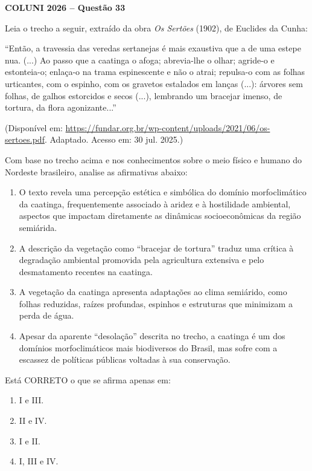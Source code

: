 \textbf{COLUNI 2026 -- Questão 33}\par\medskip Leia o trecho a seguir, extraído da obra \textit{Os Sertões} (1902), de Euclides da Cunha:

“Então, a travessia das veredas sertanejas é mais exaustiva que a de uma estepe nua. (...) Ao passo que a caatinga o afoga; abrevia-lhe o olhar; agride-o e estonteia-o; enlaça-o na trama espinescente e não o atrai; repulsa-o com as folhas urticantes, com o espinho, com os gravetos estalados em lanças (...): árvores sem folhas, de galhos estorcidos e secos (...), lembrando um bracejar imenso, de tortura, da flora agonizante...”\par
(Disponível em: \url{https://fundar.org.br/wp-content/uploads/2021/06/os-sertoes.pdf}. Adaptado. Acesso em: 30 jul. 2025.)

Com base no trecho acima e nos conhecimentos sobre o meio físico e humano do Nordeste brasileiro, analise as afirmativas abaixo:
\begin{enumerate}
\item[I.] O texto revela uma percepção estética e simbólica do domínio morfoclimático da caatinga, frequentemente associado à aridez e à hostilidade ambiental, aspectos que impactam diretamente as dinâmicas socioeconômicas da região semiárida.
\item[II.] A descrição da vegetação como “bracejar de tortura” traduz uma crítica à degradação ambiental promovida pela agricultura extensiva e pelo desmatamento recentes na caatinga.
\item[III.] A vegetação da caatinga apresenta adaptações ao clima semiárido, como folhas reduzidas, raízes profundas, espinhos e estruturas que minimizam a perda de água.
\item[IV.] Apesar da aparente “desolação” descrita no trecho, a caatinga é um dos domínios morfoclimáticos mais biodiversos do Brasil, mas sofre com a escassez de políticas públicas voltadas à sua conservação.
\end{enumerate}
Está CORRETO o que se afirma apenas em:\begin{enumerate}
\item I e III.
\item II e IV.
\item I e II.
\item I, III e IV.\end{enumerate}